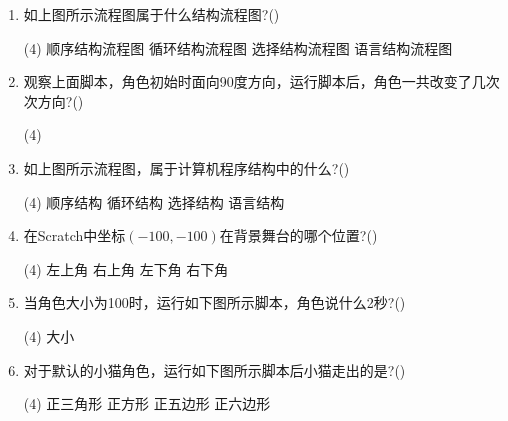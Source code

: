 \documentclass[10pt, a4paper]{article}
\begin{document}
\begin{enumerate}
        \item 如上图所示流程图属于什么结构流程图?(\qquad)
        \begin{tasks}(4)
            \task 顺序结构流程图
            \task 循环结构流程图
            \task 选择结构流程图
            \task 语言结构流程图
        \end{tasks}

        \item 观察上面脚本，角色初始时面向90度方向，运行脚本后，角色一共改变了几次次方向?(\qquad)
        \begin{tasks}(4)
        \end{tasks}

        \item 如上图所示流程图，属于计算机程序结构中的什么?(\qquad)
        \begin{tasks}(4)
            \task 顺序结构
            \task 循环结构
            \task 选择结构
            \task 语言结构
        \end{tasks}
        
        \item 在Scratch中坐标$(-100,-100)$在背景舞台的哪个位置?(\qquad)
        \begin{tasks}(4)
            \task 左上角
            \task 右上角
            \task 左下角
            \task 右下角
        \end{tasks}

        \item 当角色大小为100时，运行如下图所示脚本，角色说什么2秒?(\qquad)
        \begin{tasks}(4)
            \task 大小
        \end{tasks}

        \item 对于默认的小猫角色，运行如下图所示脚本后小猫走出的是?(\qquad)
        \begin{tasks}(4)
            \task 正三角形
            \task 正方形
            \task 正五边形
            \task 正六边形
        \end{tasks}


\end{enumerate}
\end{document}
